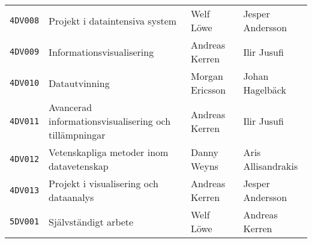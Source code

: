 \begin{longtable}[]{@{}cp{6cm}ll@{}}
\texttt{4DV008} & Projekt i dataintensiva system                        & Welf Löwe         & Jesper Andersson    \tabularnewline
\texttt{4DV009} & Informationsvisualisering                             & Andreas Kerren    & Ilir Jusufi         \tabularnewline
\texttt{4DV010} & Datautvinning                                         & Morgan Ericsson   & Johan Hagelbäck     \tabularnewline
\texttt{4DV011} & Avancerad informationsvisualisering och tillämpningar & Andreas Kerren    & Ilir Jusufi         \tabularnewline
\texttt{4DV012} & Vetenskapliga metoder inom datavetenskap              & Danny Weyns       & Aris Allisandrakis  \tabularnewline
\texttt{4DV013} & Projekt i visualisering och dataanalys                & Andreas Kerren    & Jesper Andersson    \tabularnewline
\texttt{5DV001} & Självständigt arbete                                  & Welf Löwe         & Andreas Kerren      \tabularnewline
\bottomrule
\end{longtable}